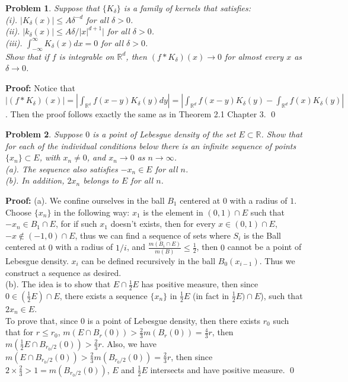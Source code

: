 \documentclass[12pt]{article}
\newtheorem{problem}{Problem}
\begin{document}
\begin{problem}
Suppose that $\{K_{\delta}\}$ is a family of kernels that satisfies: \\

(i). $|K_{\delta}(x)|\leq A\delta^{-d}$ for all $\delta > 0$. \\
\indent (ii). $|k_{\delta}(x)|\leq A\delta/|x|^{d+1}|$ for all $\delta > 0$. \\ 
\indent (iii). $\int_{-\infty}^{\infty}K_{\delta}(x)dx = 0$ for all $\delta > 0$. \\

Show that if $f$ is integrable on $\mathbb{R}^{d}$, then $(f\ast K_{\delta})(x) \to 0$ for almost every $x$ as $\delta\to 0$.
\end{problem}

\textbf{Proof:} Notice that $\left | (f \ast K_{\delta})(x) \right | = \left | \int_{\mathbb{R^{d}}} f(x-y)K_{\delta}(y)dy \right | = \left | \int_{\mathbb{R}^{d}}f(x-y)K_{\delta}(y) - \int_{\mathbb{R}^{d}}f(x)K_{\delta}(y)\right |$. Then the proof follows exactly the same as in Theorem 2.1 Chapter 3. \qed

\begin{problem}
Suppose $0$ is a point of Lebesgue density of the set $E\subset\mathbb{R}$. Show that for each of the individual conditions below there is an infinite sequence of points $\{x_{n}\}\subset E$, with $x_{n}\neq 0$, and $x_{n}\to 0$ as $n\to \infty$. \\

(a). The sequence also satisfies $-x_{n}\in E$ for all $n$. \\
\indent (b). In addition, $2x_{n}$ belongs to $E$ for all $n$.
\end{problem}

\textbf{Proof:} (a). We confine ourselves in the ball $B_{1}$ centered at $0$ with a radius of $1$. Choose $\{x_{n}\}$ in the following way: $x_{1}$ is the element in $(0, 1)\cap E$ such that $-x_{n}\in B_{1}\cap E$, for if such $x_{1}$ doesn't exists, then for every $x\in (0, 1)\cap E$, $-x\notin (-1, 0)\cap E$, thus we can find a sequence of sets where $S_{i}$ is the Ball centered at $0$ with a radius of $1/i$, and $\frac{m(B_{i}\cap E)}{m(B)}\leq \frac{1}{2}$, then $0$ cannot be a point of Lebesgue density. $x_{i}$ can be defined recursively in the ball $B_{0}(x_{i - 1})$. Thus we construct a sequence as desired. \\

(b). The idea is to show that $E\cap \frac{1}{2}E$ has positive measure, then since $0\in (\frac{1}{2}E)\cap E$, there exists a sequence $\{x_{n}\}$ in $\frac{1}{2}E$ (in fact in $\frac{1}{2}E)\cap E$), such that $2x_{n}\in E$. \\ 
\indent To prove that, since $0$ is a point of Lebesgue density, then there exists $r_{0}$ such that for $r \leq r_{0}$, $m(E\cap B_{r}(0)) > \frac{2}{3}m(B_{r}(0)) = \frac{4}{3}r$, then $m(\frac{1}{2}E\cap B_{r_{0}/2}(0))>\frac{2}{3}r$. Also, we have $m(E\cap B_{r_{0}/2}(0)) >\frac{2}{3}m(B_{r_{0}/2}(0)) = \frac{2}{3}r$, then since $2\times \frac{2}{3} > 1 = m(B_{r_{0}/2}(0))$, $E$ and $\frac{1}{2}E$ intersects and have positive measure. \qed
\end{document}
